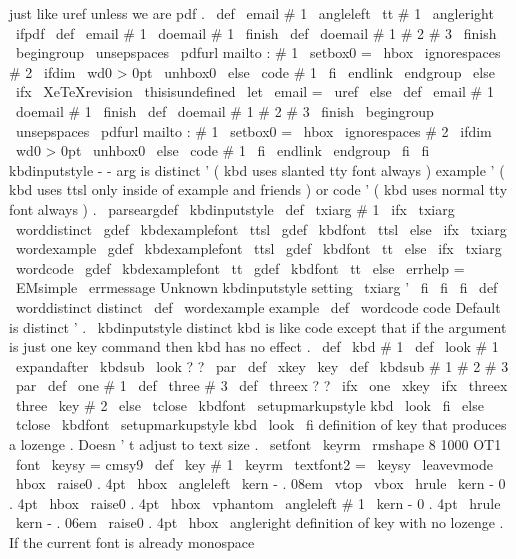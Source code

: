{{{just
like
uref
unless
we
are
pdf
.
%
%
\
def
\
email
#
1
{
\
angleleft
{
\
tt
#
1
}
\
angleright
}
\
ifpdf
\
def
\
email
#
1
{
\
doemail
#
1
\
finish
}
\
def
\
doemail
#
1
#
2
#
3
\
finish
{
\
begingroup
\
unsepspaces
\
pdfurl
{
mailto
:
#
1
}
%
\
setbox0
=
\
hbox
{
\
ignorespaces
#
2
}
%
\
ifdim
\
wd0
>
0pt
\
unhbox0
\
else
\
code
{
#
1
}
\
fi
\
endlink
\
endgroup
}
\
else
\
ifx
\
XeTeXrevision
\
thisisundefined
\
let
\
email
=
\
uref
\
else
\
def
\
email
#
1
{
\
doemail
#
1
\
finish
}
\
def
\
doemail
#
1
#
2
#
3
\
finish
{
\
begingroup
\
unsepspaces
\
pdfurl
{
mailto
:
#
1
}
%
\
setbox0
=
\
hbox
{
\
ignorespaces
#
2
}
%
\
ifdim
\
wd0
>
0pt
\
unhbox0
\
else
\
code
{
#
1
}
\
fi
\
endlink
\
endgroup
}
\
fi
\
fi
%
kbdinputstyle
-
-
arg
is
distinct
'
(
kbd
uses
slanted
tty
font
always
)
%
example
'
(
kbd
uses
ttsl
only
inside
of
example
and
friends
)
%
or
code
'
(
kbd
uses
normal
tty
font
always
)
.
\
parseargdef
\
kbdinputstyle
{
%
\
def
\
txiarg
{
#
1
}
%
\
ifx
\
txiarg
\
worddistinct
\
gdef
\
kbdexamplefont
{
\
ttsl
}
\
gdef
\
kbdfont
{
\
ttsl
}
%
\
else
\
ifx
\
txiarg
\
wordexample
\
gdef
\
kbdexamplefont
{
\
ttsl
}
\
gdef
\
kbdfont
{
\
tt
}
%
\
else
\
ifx
\
txiarg
\
wordcode
\
gdef
\
kbdexamplefont
{
\
tt
}
\
gdef
\
kbdfont
{
\
tt
}
%
\
else
\
errhelp
=
\
EMsimple
\
errmessage
{
Unknown
kbdinputstyle
setting
\
txiarg
'
}
%
\
fi
\
fi
\
fi
}
\
def
\
worddistinct
{
distinct
}
\
def
\
wordexample
{
example
}
\
def
\
wordcode
{
code
}
%
Default
is
distinct
'
.
\
kbdinputstyle
distinct
%
kbd
is
like
code
except
that
if
the
argument
is
just
one
key
command
%
then
kbd
has
no
effect
.
\
def
\
kbd
#
1
{
{
\
def
\
look
{
#
1
}
\
expandafter
\
kbdsub
\
look
?
?
\
par
}
}
\
def
\
xkey
{
\
key
}
\
def
\
kbdsub
#
1
#
2
#
3
\
par
{
%
\
def
\
one
{
#
1
}
\
def
\
three
{
#
3
}
\
def
\
threex
{
?
?
}
%
\
ifx
\
one
\
xkey
\
ifx
\
threex
\
three
\
key
{
#
2
}
%
\
else
{
\
tclose
{
\
kbdfont
\
setupmarkupstyle
{
kbd
}
\
look
}
}
\
fi
\
else
{
\
tclose
{
\
kbdfont
\
setupmarkupstyle
{
kbd
}
\
look
}
}
\
fi
}
%
definition
of
key
that
produces
a
lozenge
.
Doesn
'
t
adjust
to
text
size
.
%
\
setfont
\
keyrm
\
rmshape
{
8
}
{
1000
}
{
OT1
}
%
\
font
\
keysy
=
cmsy9
%
\
def
\
key
#
1
{
{
\
keyrm
\
textfont2
=
\
keysy
\
leavevmode
\
hbox
{
%
%
\
raise0
.
4pt
\
hbox
{
\
angleleft
}
\
kern
-
.
08em
\
vtop
{
%
%
\
vbox
{
\
hrule
\
kern
-
0
.
4pt
%
\
hbox
{
\
raise0
.
4pt
\
hbox
{
\
vphantom
{
\
angleleft
}
}
#
1
}
}
%
%
\
kern
-
0
.
4pt
\
hrule
}
%
%
\
kern
-
.
06em
\
raise0
.
4pt
\
hbox
{
\
angleright
}
}
}
}
%
definition
of
key
with
no
lozenge
.
If
the
current
font
is
already
%
monospace
}}}
